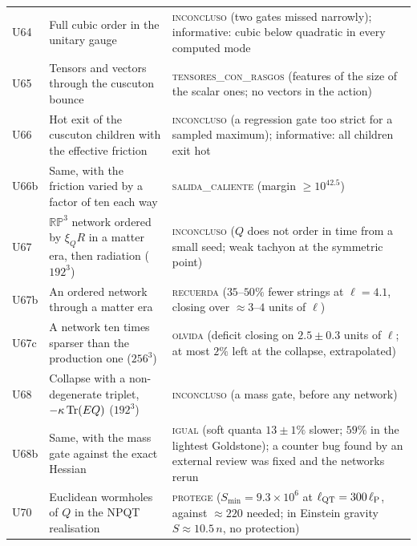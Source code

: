 \documentclass[11pt,a4paper]{article}
\newcommand{\RP}{\mathbb{RP}^3}
\begin{document}
\begin{small}
\begin{longtable}{L{1.3cm}L{6.0cm}L{7.6cm}}
U64 & Full cubic order in the unitary gauge & \textsc{inconcluso} (two gates missed narrowly); informative: cubic below quadratic in every computed mode \\
U65 & Tensors and vectors through the cuscuton bounce & \textsc{tensores\_con\_rasgos} (features of the size of the scalar ones; no vectors in the action) \\
U66 & Hot exit of the cuscuton children with the effective friction & \textsc{inconcluso} (a regression gate too strict for a sampled maximum); informative: all children exit hot \\
U66b & Same, with the friction varied by a factor of ten each way & \textsc{salida\_caliente} (margin $\ge10^{42.5}$) \\
U67 & $\RP$ network ordered by $\xi_QR$ in a matter era, then radiation ($192^3$) & \textsc{inconcluso} ($Q$ does not order in time from a small seed; weak tachyon at the symmetric point) \\
U67b & An ordered network through a matter era & \textsc{recuerda} ($35$--$50\%$ fewer strings at $\ell=4.1$, closing over $\approx3$--$4$ units of $\ell$) \\
U67c & A network ten times sparser than the production one ($256^3$) & \textsc{olvida} (deficit closing on $2.5\pm0.3$ units of $\ell$; at most $2\%$ left at the collapse, extrapolated) \\
U68 & Collapse with a non-degenerate triplet, $-\kappa\,{\rm Tr}(EQ)$ ($192^3$) & \textsc{inconcluso} (a mass gate, before any network) \\
U68b & Same, with the mass gate against the exact Hessian & \textsc{igual} (soft quanta $13\pm1\%$ slower; $59\%$ in the lightest Goldstone); a counter bug found by an external review was fixed and the networks rerun \\
U70 & Euclidean wormholes of $Q$ in the NPQT realisation & \textsc{protege} ($S_{\min}=9.3\times10^{6}$ at $\ell_{\rm QT}=300\,\ell_{\rm P}$, against $\approx220$ needed; in Einstein gravity $S\approx10.5\,n$, no protection) \\
\end{longtable}
\end{small}


\begin{multicols}{2}[\section*{\refname}]
\renewcommand{\bibsection}{}
\setlength{\bibsep}{0.5pt plus 0.5pt}
\raggedcolumns
\footnotesize

\end{multicols}
\end{document}

